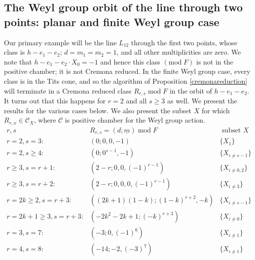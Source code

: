 \documentclass[12pt]{article}
\numberwithin{equation}{section}
\numberwithin{equation}{section}
\numberwithin{subeq}{equation}
\def\calC{\mathcal{C}}
\def\mod{\text{mod}\;}
\begin{document}
\subsection{The Weyl group orbit of the line through two points: planar and finite Weyl group case}
Our primary example will be the line $L_{12}$ through the first two points,
whose class is $h-e_1-e_2$; $d=m_1=m_2=1$, and all other multiplicities are zero.
We note that $h-e_1-e_2 \cdot X_0 = -1$ and hence this class $(\mod F)$ is not in the positive chamber; it is not Cremona reduced.
In the finite Weyl group case, every class is in the Tits cone,
and so the algorithm of Proposition \ref{cremonareduction}
will terminate in a Cremona reduced class $R_{r,s} \;\mod F$ in the orbit of $h-e_1-e_2$.
It turns out that this happens for $r=2$ and all $s \geq 3$ as well.
We present the results for the various cases below.
We also present the subset $X$ for which $R_{r,x} \in \calC_X$,
where $\calC$ is positive chamber for the Weyl group action.
\[
\begin{matrix}
r, s & R_{r,s}=(d;\underline{m})\; \mod F & \text{ subset }X \\ \hline
r=2, s =3: & (0; 0,0, -1) & \{X_1\} \\
r=2, s \geq 4: & (0; 0^{s-1}, -1) & \{X_{i\neq s-1}\} \\
r \geq 3, s=r+1: & (2-r;0,0,(-1)^{r-1}) & \{X_{i \neq 0,2}\}\\
r \geq 3, s=r+2: & (2-r; 0,0,0,(-1)^{r-1}) & \{X_{i\neq 3}\}\\
r=2k \geq 2, s=r+3: & ((2k+1)(1-k); (1-k)^{r+2}, -k) & \{X_{i \neq s-1}\}\\
r=2k+1 \geq 3, s= r+3: & (-2k^2-2k+1; (-k)^{r+3}) & \{X_{i \neq 0}\}\\
r=3, s=7: & (-3;0,(-1)^6) & \{X_{i\neq 1}\}\\
r=4, s=8: & (-14;-2,(-3)^7) & \{X_{i\neq 1}\}\\
\end{matrix}
\]
\end{document}
